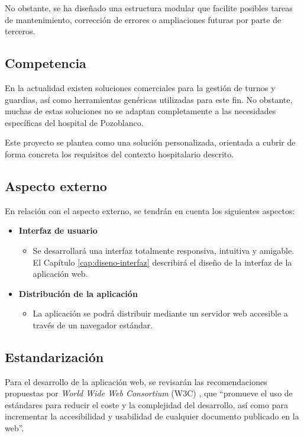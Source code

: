 No obstante, se ha diseñado una estructura modular que facilite posibles tareas de mantenimiento,
corrección de errores o ampliaciones futuras por parte de terceros.

\subsection{Competencia}

    En la actualidad existen soluciones comerciales para la gestión de turnos y guardias, así como
    herramientas genéricas utilizadas para este fin. No obstante, muchas de estas soluciones no se
    adaptan completamente a las necesidades específicas del hospital de Pozoblanco.

    Este proyecto se plantea como una solución personalizada, orientada a cubrir de forma concreta
    los requisitos del contexto hospitalario descrito.

\subsection{Aspecto externo}

En relación con el aspecto externo, se tendrán en cuenta los siguientes aspectos:

\begin{itemize}
\item \textbf{Interfaz de usuario}
\begin{itemize}
\item Se desarrollará una interfaz totalmente responsiva, intuitiva y amigable. El Capítulo \ref{cap:diseno-interfaz} describirá el diseño de la interfaz de la aplicación web.
\end{itemize}
\item \textbf{Distribución de la aplicación}
\begin{itemize}
\item La aplicación se podrá distribuir mediante un servidor web accesible a través de un navegador estándar.
\end{itemize}
\end{itemize}


\subsection{Estandarización}

    Para el desarrollo de la aplicación web, se revisarán las recomendaciones propuestas por \textit{World Wide Web Consortium} (W3C) \cite{w3c}, que ``promueve el uso de estándares para reducir el coste y la complejidad del desarrollo, así como para incrementar la accesibilidad y usabilidad de cualquier documento publicado en la web''.

